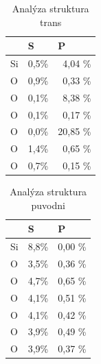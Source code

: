 \documentclass[
  digital, %
  table,   %
  lof,     %
  lot,     %
  oneside,
]{fithesis3}
\begin{document}
\begin{table}[htbp]
\caption{Analýza struktura trans}
\begin{center}
\begin{tabular}{|l|r|r|}
\hline
 & \multicolumn{1}{l|}{S} & \multicolumn{1}{l|}{P} \\ \hline
Si & 0,5\% & 4,04 \% \\ \hline
O & 0,9\% & 0,33 \% \\ \hline
O & 0,1\% & 8,38 \% \\ \hline
O & 0,1\% & 0,17 \% \\ \hline
O & 0,0\% & 20,85 \% \\ \hline
O & 1,4\% & 0,65 \% \\ \hline
O & 0,7\% & 0,15 \% \\ \hline
\end{tabular}
\end{center}
\label{struktura_C_trans_MPA}
\end{table}

\begin{table}[htbp]
\caption{Analýza struktura puvodni}
\begin{center}
\begin{tabular}{|l|r|r|}
\hline
 & \multicolumn{1}{l|}{S} & \multicolumn{1}{l|}{P} \\ \hline
Si & 8,8\% & 0,00 \% \\ \hline
O & 3,5\% & 0,36 \% \\ \hline
O & 4,7\% & 0,65 \% \\ \hline
O & 4,1\% & 0,51 \% \\ \hline
O & 4,1\% & 0,42 \% \\ \hline
O & 3,9\% & 0,49 \% \\ \hline
O & 3,9\% & 0,37 \% \\ \hline
\end{tabular}
\end{center}
\label{struktura_puvodni_MPA}
\end{table}
\end{document}
